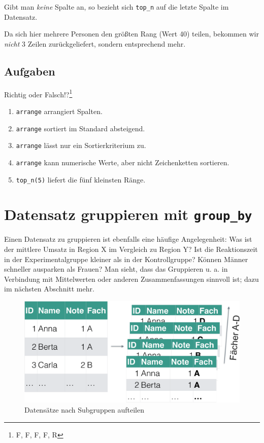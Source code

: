 \documentclass[12pt,ngerman,paper=a4,pagesize,DIV=13]{scrreprt}
\providecommand{\tightlist}{%
  \setlength{\itemsep}{0pt}\setlength{\parskip}{0pt}}
\begin{document}
Gibt man \emph{keine} Spalte an, so bezieht sich \texttt{top\_n} auf die
letzte Spalte im Datensatz.

Da sich hier mehrere Personen den größten Rang (Wert 40) teilen,
bekommen wir \emph{nicht} 3 Zeilen zurückgeliefert, sondern entsprechend
mehr.

\hypertarget{aufgaben-2}{%
\subsection{Aufgaben}\label{aufgaben-2}}

Richtig oder Falsch!?\footnote{F, F, F, F, R}

\begin{enumerate}
\def\labelenumi{\arabic{enumi}.}
\tightlist
\item
  \texttt{arrange} arrangiert Spalten.
\item
  \texttt{arrange} sortiert im Standard absteigend.
\item
  \texttt{arrange} lässt nur ein Sortierkriterium zu.
\item
  \texttt{arrange} kann numerische Werte, aber nicht Zeichenketten
  sortieren.
\item
  \texttt{top\_n(5)} liefert die fünf kleinsten Ränge.
\end{enumerate}

\hypertarget{datensatz-gruppieren-mit-group_by}{%
\section{\texorpdfstring{Datensatz gruppieren mit
\texttt{group\_by}}{Datensatz gruppieren mit group\_by}}\label{datensatz-gruppieren-mit-group_by}}

Einen Datensatz zu gruppieren ist ebenfalls eine häufige Angelegenheit:
Was ist der mittlere Umsatz in Region X im Vergleich zu Region Y? Ist
die Reaktionszeit in der Experimentalgruppe kleiner als in der
Kontrollgruppe? Können Männer schneller ausparken als Frauen? Man sieht,
dass das Gruppieren u. a. in Verbindung mit Mittelwerten oder anderen
Zusammenfassungen sinnvoll ist; dazu im nächsten Abschnitt mehr.

\begin{figure}

{\centering \includegraphics[width=0.6\linewidth]{Inhalte/images/Datenjudo/group_by} 

}

\caption{Datensätze nach Subgruppen aufteilen}\label{fig:fig-groupby}
\end{figure}
\end{document}
